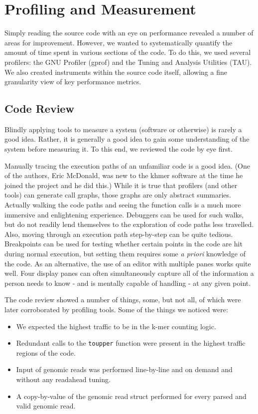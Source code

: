 \documentclass{article}
\begin{document}
\section{Profiling and Measurement}

Simply reading the source code with an eye on performance revealed a number of
areas for improvement. However, we wanted to systematically quantify the amount
of time spent in various sections of the code. To do this, we used several
profilers: the GNU Profiler (gprof) and the Tuning and Analysis Utilities
(TAU). We also created instruments within the source code itself, allowing a
fine granularity view of key performance metrics.

\subsection{Code Review}

Blindly applying tools to measure a system (software or otherwise) is rarely a
good idea. Rather, it is generally a good idea to gain some understanding of
the system before measuring it. To this end, we reviewed the code by eye first.

Manually tracing the execution paths of an unfamiliar code is a good idea.
(One of the authors, Eric McDonald, was new to the khmer software at the time
he joined the project and he did this.) While it is true that profilers (and
other tools) can generate call graphs, those graphs are only abstract
summaries. Actually walking the code paths and seeing the function calls is a
much more immersive and enlightening experience. Debuggers can be used for such 
walks, but do not readily lend themselves to the exploration of code paths less 
travelled. Also, moving through an execution path step-by-step can be quite 
tedious. Breakpoints can be used for testing whether certain points in the 
code are hit during normal execution, but setting them requires some 
\textit{a priori} knowledge of the code. As an alternative, the use of an 
editor with multiple panes works quite well. Four display panes can often 
simultaneously capture all of the information a person needs to know - and is 
mentally capable of handling - at any given point.

The code review showed a number of things, some, but not all, of which were
later corroborated by profiling tools. Some of the things we noticed were:

\begin{itemize}
\item We expected the highest traffic to be in the k-mer counting logic.
\item Redundant calls to the \texttt{toupper} function were present in the highest traffic 
regions of the code.
\item Input of genomic reads was performed line-by-line and on demand and without 
any readahead tuning.
\item A copy-by-value of the genomic read struct performed for every parsed and valid genomic read.
\end{itemize}
\end{document}
